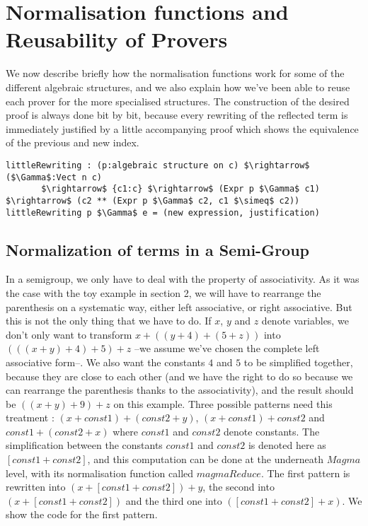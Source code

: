 \section{Normalisation functions and Reusability of Provers}

\label{sect:reuse}

We now describe briefly how the normalisation functions work for some of the different algebraic structures, and we also explain how we've been able to reuse each prover for the more specialised structures. The construction of the desired proof is always done bit by bit, because every rewriting of the reflected term is immediately justified by a little accompanying proof which shows the equivalence of the previous and new index.

\begin{lstlisting}
littleRewriting : (p:algebraic structure on c) $\rightarrow$ ($\Gamma$:Vect n c) 
       $\rightarrow$ {c1:c} $\rightarrow$ (Expr p $\Gamma$ c1) $\rightarrow$ (c2 ** (Expr p $\Gamma$ c2, c1 $\simeq$ c2))
littleRewriting p $\Gamma$ e = (new expression, justification)
\end{lstlisting}


	\subsection {Normalization of terms in a Semi-Group}
In a semigroup, we only have to deal with the property of associativity. As it was the case with the toy example in section 2, we will have to rearrange the parenthesis on a systematic way, either left associative, or right associative. But this is not the only thing that we have to do. If $x$, $y$ and $z$ denote variables, we don't only want to transform $x+((y+4)+(5+z))$ into $(((x+y)+4)+5)+z$ --we assume we've chosen the complete left associative form--. We also want the constants $4$ and $5$ to be simplified together, because they are close to each other (and we have the right to do so because we can rearrange the parenthesis thanks to the associativity), and the result should be $((x+y)+9)+z$ on this example. Three possible patterns need this treatment : $(x+const1)+(const2+y)$, $(x + const1) + const2$  and $const1 + (const2 + x)$ where $const1$ and $const2$ denote constants. The simplification between the constants $const1$ and $const2$ is denoted here as $[const1+const2]$, and this computation can be done at the underneath $Magma$ level, with its normalisation function called $magmaReduce$.
The first pattern is rewritten into $(x + [const1+const2]) + y$, the second into $(x + [const1+const2])$ and the third one into $([const1 + const2] + x)$.
We show the code for the first pattern.

